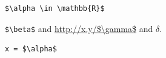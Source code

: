 \begin{verbatim}
$\alpha \in \mathbb{R}$
\end{verbatim}
\verb|$\beta$| and \url{http://x.y/$\gamma$} and $δ$.
\begin{lstlisting}
x = $\alpha$
\end{lstlisting}
